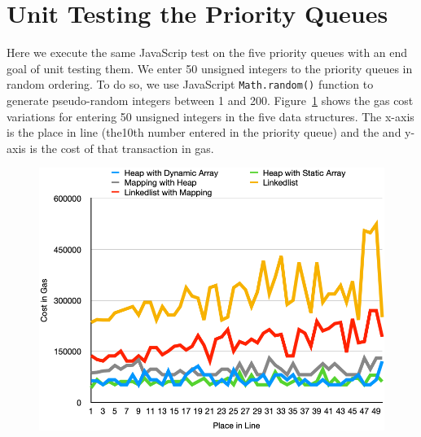 \begin{enumerate}
\begin{itemize}
\end{itemize}




\end{enumerate}






\section{Unit Testing the Priority Queues}

Here we execute the same JavaScrip test on the five priority queues with an end goal of unit testing them. We enter 50 unsigned integers to the priority queues in random ordering. To do so, we use JavaScript \texttt{Math.random()} function to generate pseudo-random integers between 1 and 200. Figure~\ref{fig:average_uints_insertion} shows the gas cost variations for entering 50 unsigned integers in the five data structures. The x-axis is the place in line (\eg the10th number entered in the priority queue) and the and y-axis is the cost of that transaction in gas. 


\begin{figure}[htb!p]
\centering
\includegraphics[width=1\textwidth]{fig/average_uints_insertion.png}
\caption{\footnotesize{}  \label{fig:average_uints_insertion}}
\end{figure}

